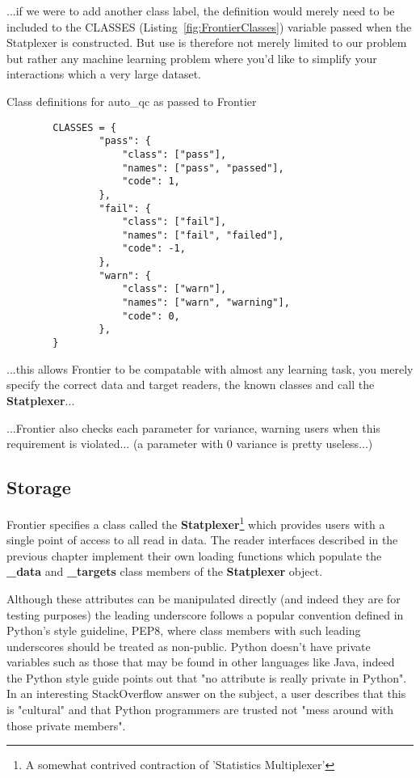 ...if we were to add another
class label, the definition would merely need to be included to the CLASSES
(Listing~\ref{fig:FrontierClasses}) variable passed when the Statplexer is
constructed. But use is therefore not merely limited to our problem but rather
any machine learning problem where you'd like to simplify your interactions
which a very large dataset.

\begin{listing}[H]
    \caption[FrontierClasses]{Class definitions for auto\_qc as passed to Frontier}
    \label{fig:FrontierClasses}
    \begin{verbatim}
        CLASSES = {
                "pass": {
                    "class": ["pass"],
                    "names": ["pass", "passed"],
                    "code": 1,
                },
                "fail": {
                    "class": ["fail"],
                    "names": ["fail", "failed"],
                    "code": -1,
                },
                "warn": {
                    "class": ["warn"],
                    "names": ["warn", "warning"],
                    "code": 0,
                },
        }
    \end{verbatim}
\end{listing}

...this allows Frontier to be compatable with almost any learning task, you
merely specify the correct data and target readers, the known classes and call
the \textbf{Statplexer}...

...Frontier also checks each parameter for variance, warning users when this
requirement is violated... (a parameter with 0 variance is pretty useless...)

\subsection{Storage}

Frontier specifies a class called the \textbf{Statplexer}\footnote{A somewhat
contrived contraction of 'Statistics Multiplexer'} which provides users with a
single point of access to all read in data. The reader interfaces described in
the previous chapter implement their own loading functions which populate the
\textbf{\_data} and \textbf{\_targets} class members of the \textbf{Statplexer}
object.

Although these attributes can be manipulated directly (and indeed they are for
testing purposes) the leading underscore follows a popular convention defined in
Python's style guideline, PEP8\citep{pep8}, where class members with such
leading underscores should be treated as non-public. Python doesn't have private
variables such as those that may be found in other languages like Java, indeed
the Python style guide points out that "no attribute is really private in
Python"\citep{pep8}. In an interesting StackOverflow answer on the subject, a
user describes that this is "cultural"\citep{so:pythonprivate} and that Python
programmers are trusted not "mess around with those private members".

